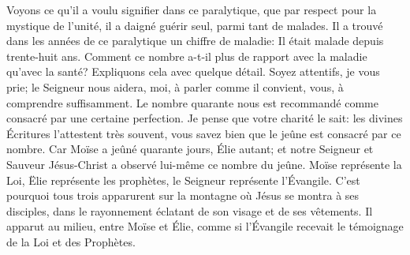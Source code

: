 Voyons ce qu’il a voulu signifier dans ce paralytique,
	que par respect pour la mystique de l’unité,
	il a daigné guérir seul, parmi tant de malades.
Il a trouvé dans les années de ce paralytique un chiffre de maladie:
	Il était malade depuis trente-huit ans.
Comment ce nombre a-t-il plus de rapport avec la maladie qu’avec la santé?
	Expliquons cela avec quelque détail.
Soyez attentifs, je vous prie;
	le Seigneur nous aidera, moi, à parler comme il convient,
	vous, à comprendre suffisamment.
Le nombre quarante nous est recommandé
	comme consacré par une certaine perfection.
Je pense que votre charité le sait:
	les divines Écritures l’attestent très souvent,
	vous savez bien que le jeûne est consacré par ce nombre.
Car Moïse a jeûné quarante jours, Élie autant;
	et notre Seigneur et Sauveur Jésus-Christ
		a observé lui-même ce nombre du jeûne.
Moïse représente la Loi, Ëlie représente les prophètes,
	le Seigneur représente l’Évangile.
C’est pourquoi tous trois apparurent sur la montagne
		où Jésus se montra à ses disciples,
	dans le rayonnement éclatant de son visage et de ses vêtements.
Il apparut au milieu, entre Moïse et Élie,
	comme si l’Évangile recevait le témoignage de la Loi et des Prophètes.
